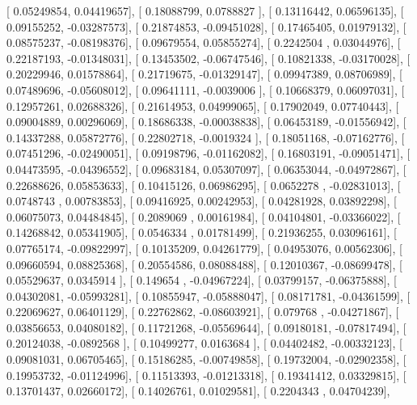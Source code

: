 \documentclass{article}
\begin{document}
       [ 0.05249854,  0.04419657],
       [ 0.18088799,  0.0788827 ],
       [ 0.13116442,  0.06596135],
       [ 0.09155252, -0.03287573],
       [ 0.21874853, -0.09451028],
       [ 0.17465405,  0.01979132],
       [ 0.08575237, -0.08198376],
       [ 0.09679554,  0.05855274],
       [ 0.2242504 ,  0.03044976],
       [ 0.22187193, -0.01348031],
       [ 0.13453502, -0.06747546],
       [ 0.10821338, -0.03170028],
       [ 0.20229946,  0.01578864],
       [ 0.21719675, -0.01329147],
       [ 0.09947389,  0.08706989],
       [ 0.07489696, -0.05608012],
       [ 0.09641111, -0.0039006 ],
       [ 0.10668379,  0.06097031],
       [ 0.12957261,  0.02688326],
       [ 0.21614953,  0.04999065],
       [ 0.17902049,  0.07740443],
       [ 0.09004889,  0.00296069],
       [ 0.18686338, -0.00038838],
       [ 0.06453189, -0.01556942],
       [ 0.14337288,  0.05872776],
       [ 0.22802718, -0.0019324 ],
       [ 0.18051168, -0.07162776],
       [ 0.07451296, -0.02490051],
       [ 0.09198796, -0.01162082],
       [ 0.16803191, -0.09051471],
       [ 0.04473595, -0.04396552],
       [ 0.09683184,  0.05307097],
       [ 0.06353044, -0.04972867],
       [ 0.22688626,  0.05853633],
       [ 0.10415126,  0.06986295],
       [ 0.0652278 , -0.02831013],
       [ 0.0748743 ,  0.00783853],
       [ 0.09416925,  0.00242953],
       [ 0.04281928,  0.03892298],
       [ 0.06075073,  0.04484845],
       [ 0.2089069 ,  0.00161984],
       [ 0.04104801, -0.03366022],
       [ 0.14268842,  0.05341905],
       [ 0.0546334 ,  0.01781499],
       [ 0.21936255,  0.03096161],
       [ 0.07765174, -0.09822997],
       [ 0.10135209,  0.04261779],
       [ 0.04953076,  0.00562306],
       [ 0.09660594,  0.08825368],
       [ 0.20554586,  0.08088488],
       [ 0.12010367, -0.08699478],
       [ 0.05529637,  0.0345914 ],
       [ 0.149654  , -0.04967224],
       [ 0.03799157, -0.06375888],
       [ 0.04302081, -0.05993281],
       [ 0.10855947, -0.05888047],
       [ 0.08171781, -0.04361599],
       [ 0.22069627,  0.06401129],
       [ 0.22762862, -0.08603921],
       [ 0.079768  , -0.04271867],
       [ 0.03856653,  0.04080182],
       [ 0.11721268, -0.05569644],
       [ 0.09180181, -0.07817494],
       [ 0.20124038, -0.0892568 ],
       [ 0.10499277,  0.0163684 ],
       [ 0.04402482, -0.00332123],
       [ 0.09081031,  0.06705465],
       [ 0.15186285, -0.00749858],
       [ 0.19732004, -0.02902358],
       [ 0.19953732, -0.01124996],
       [ 0.11513393, -0.01213318],
       [ 0.19341412,  0.03329815],
       [ 0.13701437,  0.02660172],
       [ 0.14026761,  0.01029581],
       [ 0.2204343 ,  0.04704239],
\end{document}
